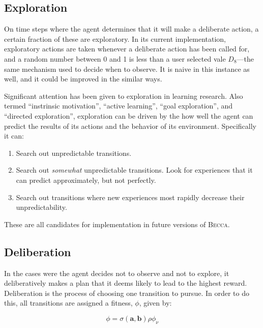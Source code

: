 \subsection{Exploration}
On time steps where the agent determines that it will make a deliberate action, a certain fraction of these are exploratory. In its current implementation, exploratory actions are taken whenever a deliberate action has been called for, and a random number between 0 and 1 is less than a user selected vale $D_8$---the same mechanism used to decide when to observe. It is naive in this instance as well, and it could be improved in the similar ways. 

Significant attention has been given to exploration in learning research. Also termed ``instrinsic motivation'', ``active learning'', ``goal exploration'', and ``directed exploration'',  exploration can be driven by the how well the agent can predict the results of its actions and the behavior of its environment. Specifically it can:

\begin{enumerate}
\item Search out unpredictable transitions.
\item Search out {\em somewhat} unpredictable transitions. Look for experiences that it can  predict approximately, but not perfectly.
\item Search out transitions where new experiences most rapidly decrease their unpredictability.
\end{enumerate}

These are all candidates for implementation in future versions of \textsc{Becca}.


\subsection{Deliberation}
In the cases were the agent decides not to observe and not to explore, it deliberatively makes a plan that it deems likely to lead to the highest reward. Deliberation is the process of choosing one transition to pursue. In order to do this, all transitions are assigned a fitness, $\phi$, given by:

\begin{equation}
\phi = \sigma(\mathbf{a},\mathbf{b})  \rho \phi_\nu
\end{equation}

